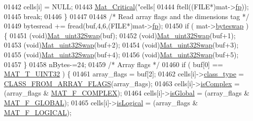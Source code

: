 \begin{DoxyCode}
{{{{{{{{{{01442                 cells[i] = NULL;
01443                 \hyperlink{group__mat__util_gaf51f2bfbb5580f575e4dd79757e2b80c}{Mat\_Critical}(\textcolor{stringliteral}{"cells[%
01444                     ftell((FILE*)mat->\hyperlink{struct__mat__t_a85f562e407ca9ad4d2a6e14f839432b7}{fp}));
01445                 \textcolor{keywordflow}{break};
01446             \}
01447 
01448             \textcolor{comment}{/* Read array flags and the dimensions tag */}
01449             bytesread += fread(buf,4,6,(FILE*)mat->\hyperlink{struct__mat__t_a85f562e407ca9ad4d2a6e14f839432b7}{fp});
01450             \textcolor{keywordflow}{if} ( mat->\hyperlink{struct__mat__t_a99d207977af5e04941ace56d71817a40}{byteswap} ) \{
01451                 (void)\hyperlink{endian_8c_a8cb0d0750e2eaf9840d95db531934f4f}{Mat\_uint32Swap}(buf);
01452                 (void)\hyperlink{endian_8c_a8cb0d0750e2eaf9840d95db531934f4f}{Mat\_uint32Swap}(buf+1);
01453                 (void)\hyperlink{endian_8c_a8cb0d0750e2eaf9840d95db531934f4f}{Mat\_uint32Swap}(buf+2);
01454                 (void)\hyperlink{endian_8c_a8cb0d0750e2eaf9840d95db531934f4f}{Mat\_uint32Swap}(buf+3);
01455                 (void)\hyperlink{endian_8c_a8cb0d0750e2eaf9840d95db531934f4f}{Mat\_uint32Swap}(buf+4);
01456                 (void)\hyperlink{endian_8c_a8cb0d0750e2eaf9840d95db531934f4f}{Mat\_uint32Swap}(buf+5);
01457             \}
01458             nBytes-=24;
01459             \textcolor{comment}{/* Array flags */}
01460             \textcolor{keywordflow}{if} ( buf[0] == \hyperlink{group___m_a_t_ggacf7b3b879282b7ab3a51190e49bf3453aa397e285a23fe240368b752897652c6a}{MAT\_T\_UINT32} ) \{
01461                array\_flags = buf[2];
01462                cells[i]->\hyperlink{group___m_a_t_aff13035bf3265dd7d9425e5d40c839d4}{class\_type} = \hyperlink{mat5_8c_a85a616d27707e89bda9fd2e9bbb6a586}{CLASS\_FROM\_ARRAY\_FLAGS}(array\_flags);
01463                cells[i]->\hyperlink{group___m_a_t_aeb03b3a69f108dc05470b00443a43739}{isComplex}  = (array\_flags & \hyperlink{group___m_a_t_ggab9d6ef9e3ddca78a317b173f01d53fbbacd7b091a11184aad7fc6078c04470780}{MAT\_F\_COMPLEX});
01464                cells[i]->\hyperlink{group___m_a_t_af26c71c4c0ddb14931d15910dddac1bc}{isGlobal}   = (array\_flags & \hyperlink{group___m_a_t_ggab9d6ef9e3ddca78a317b173f01d53fbba49084e0c796aa7963e53f7539525d40d}{MAT\_F\_GLOBAL});
01465                cells[i]->\hyperlink{group___m_a_t_a866c1539e68073a837833d74cd4a65be}{isLogical}  = (array\_flags & \hyperlink{group___m_a_t_ggab9d6ef9e3ddca78a317b173f01d53fbba57eb5c6e200bcbc0f1b7982f29a169c2}{MAT\_F\_LOGICAL});
}}}}}}}}}}}
\end{DoxyCode}
